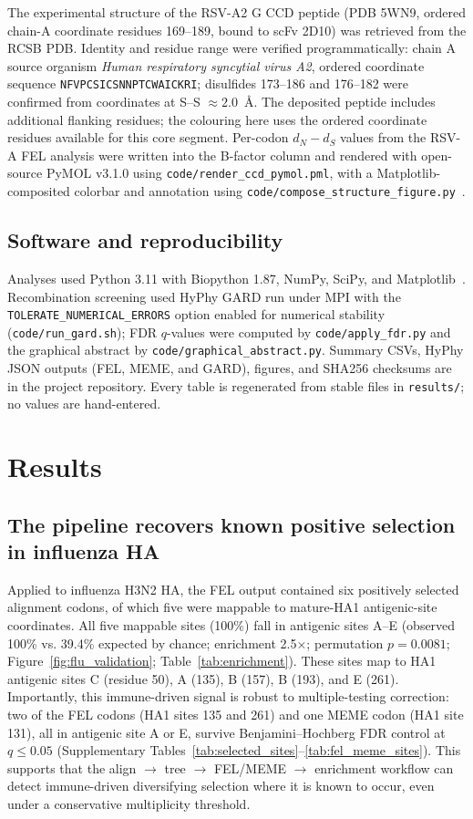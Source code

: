 \documentclass[11pt]{article}
\newcommand{\dndsdiff}{\ensuremath{d_N-d_S}}
\begin{document}
The experimental structure of the RSV-A2 G CCD peptide (PDB 5WN9, ordered chain-A coordinate residues 169--189, bound to scFv 2D10) was retrieved from the RCSB PDB. Identity and residue range were verified programmatically: chain A source organism \emph{Human respiratory syncytial virus A2}, ordered coordinate sequence \texttt{NFVPCSICSNNPTCWAICKRI}; disulfides 173--186 and 176--182 were confirmed from coordinates at S--S $\approx2.0$~\AA. The deposited peptide includes additional flanking residues; the colouring here uses the ordered coordinate residues available for this core segment. Per-codon \dndsdiff{} values from the RSV-A FEL analysis were written into the B-factor column and rendered with open-source PyMOL v3.1.0 using \texttt{code/render\_ccd\_pymol.pml}, with a Matplotlib-composited colorbar and annotation using \texttt{code/compose\_structure\_figure.py}~\cite{pymol}.

\subsection{Software and reproducibility}

Analyses used Python 3.11 with Biopython 1.87, NumPy, SciPy, and Matplotlib~\cite{cock2009}. Recombination screening used HyPhy GARD run under MPI with the \texttt{TOLERATE\_NUMERICAL\_ERRORS} option enabled for numerical stability (\texttt{code/run\_gard.sh}); FDR $q$-values were computed by \texttt{code/apply\_fdr.py} and the graphical abstract by \texttt{code/graphical\_abstract.py}. Summary CSVs, HyPhy JSON outputs (FEL, MEME, and GARD), figures, and SHA256 checksums are in the project repository. Every table is regenerated from stable files in \texttt{results/}; no values are hand-entered.

\section{Results}

\subsection{The pipeline recovers known positive selection in influenza HA}

Applied to influenza H3N2 HA, the FEL output contained six positively selected alignment codons, of which five were mappable to mature-HA1 antigenic-site coordinates. All five mappable sites (100\%) fall in antigenic sites A--E (observed 100\% vs. 39.4\% expected by chance; enrichment 2.5$\times$; permutation $p=0.0081$; Figure~\ref{fig:flu_validation}; Table~\ref{tab:enrichment}). These sites map to HA1 antigenic sites C (residue 50), A (135), B (157), B (193), and E (261). Importantly, this immune-driven signal is robust to multiple-testing correction: two of the FEL codons (HA1 sites 135 and 261) and one MEME codon (HA1 site 131), all in antigenic site A or E, survive Benjamini--Hochberg FDR control at $q\leq0.05$ (Supplementary Tables~\ref{tab:selected_sites}--\ref{tab:fel_meme_sites}). This supports that the align $\rightarrow$ tree $\rightarrow$ FEL/MEME $\rightarrow$ enrichment workflow can detect immune-driven diversifying selection where it is known to occur, even under a conservative multiplicity threshold.
\end{document}
